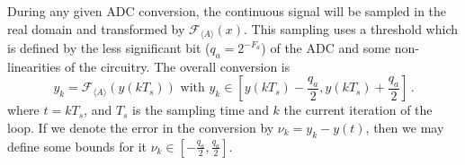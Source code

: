 \documentclass[sigconf]{llncs}
\newcommand{\mat}[1]{{#1}}
\renewcommand{\vec}[1]{{#1}}
\begin{document}
%

During any given ADC conversion, the continuous signal will be sampled in
the real domain and transformed by $\mathcal{F}_{\langle A \rangle} (x)$. 
This sampling uses a threshold which is defined by the less significant bit
($q_{a}=2^{-F_a}$) of the ADC and some non-linearities of the circuitry. 
The overall conversion is
%
$$\vec{y}_k=\mathcal{F}_{\langle A \rangle}\left(y(kT_s)\right)
  \text{ with }  \vec{y}_k \in \left[y(kT_s)-\frac{q_{a}}{2}, y(kT_s)+\frac{q_{a}}{2}\right] \,.$$
%
where $t = kT_s$, and $T_s$ is the sampling time and $k$ the current
iteration of the loop.  If we denote the error in the conversion by
$\nu_k=y_k-y(t)$, then we may define some bounds for it $\nu_k \in
[-\frac{q_{a}}{2}, \frac{q_{a}}{2}]$.
\end{document}
